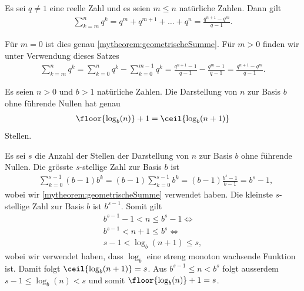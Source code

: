 \begin{mytheorem}\label{mytheorem:verallgemeinertegeometrischeSumme}
	Es sei $q \neq 1$ eine reelle Zahl und es seien $m\leq n$ natürliche Zahlen. Dann gilt
	\begin{align*}
		\sum_{k = m}^n q^k = q^m + q^{m+1} + \ldots + q^n = \frac{q^{n+1}-q^m}{q-1}.
	\end{align*}
	\begin{myproof}
		Für $m=0$ ist dies genau \cref{mytheorem:geometrischeSumme}. Für $m>0$ finden wir unter Verwendung dieses Satzes
		\begin{align*}
			\sum_{k = m}^n q^k =
			\sum_{k = 0}^n q^k - \sum_{k = 0}^{m-1} q^k =
			\frac{q^{n+1}-1}{q-1} - \frac{q^m - 1}{q-1} =
			\frac{q^{n+1}-q^m}{q-1}.
		\end{align*}
	\end{myproof}
\end{mytheorem}


\begin{mytheorem}\label{mytheorem:AnzahlZiffern}
	Es seien $n>0$ und $b>1$ natürliche Zahlen. Die Darstellung von $n$ zur Basis $b$ ohne führende Nullen hat genau
	\begin{align*}
		\floor{\log_b(n)}+1=\ceil{\log_b(n + 1)}
	\end{align*}
	Stellen.
	\begin{myproof}
		Es sei $s$ die Anzahl der Stellen der Darstellung von $n$ zur Basis $b$ ohne führende Nullen. Die grösste $s$-stellige Zahl zur Basis $b$ ist
		\begin{align*}
			 & \sum_{k = 0}^{s-1} (b-1)b^{k} = (b-1)\sum_{k = 0}^{s-1} b^{k} = (b-1)\frac{b^s - 1}{b - 1} = b^s - 1,
		\end{align*}
		wobei wir \cref{mytheorem:geometrischeSumme} verwendet haben. Die kleinste $s$-stellige Zahl zur Basis $b$ ist $b^{s-1}$. Somit gilt
		\begin{align*}
			b^{s-1} - 1 < n \leq b^s - 1 \iff \\
			b^{s-1} < n + 1 \leq b^s \iff     \\
			s-1 < \log_b(n+1) \leq s,
		\end{align*}
		wobei wir verwendet haben, dass $\log_b$ eine streng monoton wachsende Funktion ist.
		Damit folgt $\ceil{\log_b(n + 1)} = s$. Aus $b^{s-1}\leq n<b^s$ folgt ausserdem $s-1\leq\log_b(n)<s$ und somit $\floor{\log_b(n)}+1=s$.
	\end{myproof}
\end{mytheorem}



